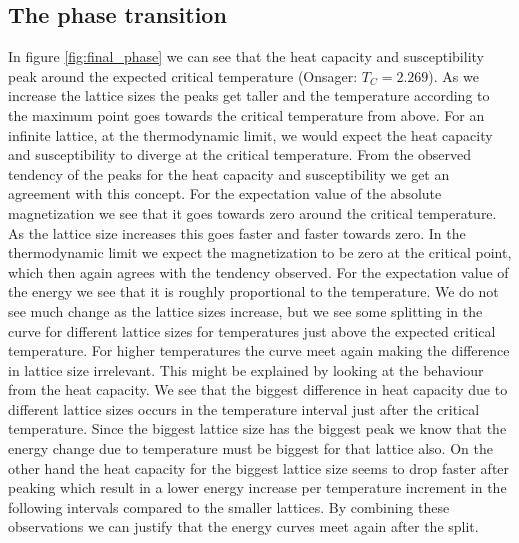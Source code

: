 \documentclass[%
 reprint,
nofootinbib,
aps,
]{revtex4-1}
\begin{document}
\subsection{The phase transition}
In figure \ref{fig:final_phase} we can see that the heat capacity and susceptibility peak around the expected critical temperature (Onsager: $T_C = 2.269$). As we increase the lattice sizes the peaks get taller and the temperature according to the maximum point goes towards the critical temperature from above. For an infinite lattice, at the thermodynamic limit, we would expect the heat capacity and susceptibility to diverge at the critical temperature. From the observed tendency of the peaks for the heat capacity and susceptibility we get an agreement with this concept. For the expectation value of the absolute magnetization we see that it goes towards zero around the critical temperature. As the lattice size increases this goes faster and faster towards zero. In the thermodynamic limit we expect the magnetization to be zero at the critical point, which then again agrees with the tendency observed. For the expectation value of the energy we see that it is roughly proportional to the temperature. We do not see much change as the lattice sizes increase, but we see some splitting in the curve for different lattice sizes for temperatures just above the expected critical temperature. For higher temperatures the curve meet again making the difference in lattice size irrelevant. This might be explained by looking at the behaviour from the heat capacity. We see that the biggest difference in heat capacity due to different lattice sizes occurs in the temperature interval just after the critical temperature. Since the biggest lattice size has the biggest peak we know that the energy change due to temperature must be biggest for that lattice also. On the other hand the heat capacity for the biggest lattice size seems to drop faster after peaking which result in a lower energy increase per temperature increment in the following intervals compared to the smaller lattices. By combining these observations we can justify that the energy curves meet again after the split.\\
\end{document}
